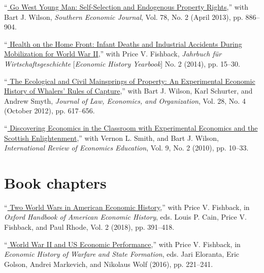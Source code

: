 \documentclass[11pt,letterpaper]{article}
\begin{document}
\begin{description}[leftmargin=0in,itemsep=.25em,itemindent=.15in]
\item 	``\href{https://doi.org/10.4284/0038-4038-2011.249}{\color{black}
			Go West Young Man: Self-Selection and Endogenous Property Rights},'' 
			with Bart J. Wilson, \emph{Southern Economic Journal}, Vol. 78, No. 2 (April 2013), pp. 886--904.
\item 	``\href{https://doi.org/10.1515/jbwg-2014-0011}{\color{black}
			Health on the Home Front: Infant Deaths and Industrial Accidents During Mobilization for World War II},'' 
			with Price V. Fishback, \emph{Jahrbuch f\"{u}r Wirtschaftsgeschichte} [\emph{Economic History Yearbook}] No. 2 (2014), pp. 15--30.
\item 	``\href{https://doi.org/10.1093/jleo/ewr024}{\color{black}
			The Ecological and Civil Mainsprings of Property: An Experimental Economic History of Whalers' Rules of Capture},'' 
			with Bart J. Wilson, Karl Schurter, and Andrew Smyth, 
			\emph{Journal of Law, Economics, and Organization}, Vol. 28, No. 4 (October 2012), pp. 617--656.
\item 	``\href{https://doi.org/10.1016/S1477-3880(15)30053-0}{\color{black}
			Discovering Economics in the Classroom with Experimental Economics and the Scottish Enlightenment},'' 
			with Vernon L. Smith, and Bart J. Wilson, \emph{International Review of Economics Education}, Vol. 9, No. 2 (2010), pp. 10--33.
\end{description}

\vspace{-1em}
\section*{Book chapters}

\begin{description}[leftmargin=0in,itemsep=.25em,itemindent=.15in]
\item 	``\href{https://doi.org/10.1017/S0022050717000791}{\color{black}
			Two World Wars in American Economic History},'' 
			with Price V. Fishback, in \emph{Oxford Handbook of American Economic History}, 
			eds. Louis P. Cain, Price V. Fishback, and Paul Rhode, Vol. 2 (2018), pp. 391--418. 
\item 	``\href{https://doi.org/10.1007/978-981-10-1605-9_9}{\color{black}
			World War II and US Economic Performance},'' 
			with Price V. Fishback, in \emph{Economic History of Warfare and State Formation},
			eds. Jari Eloranta, Eric Golson, Andrei Markevich, and Nikolaus Wolf (2016), pp. 221--241. 
\end{description}
\end{document}
